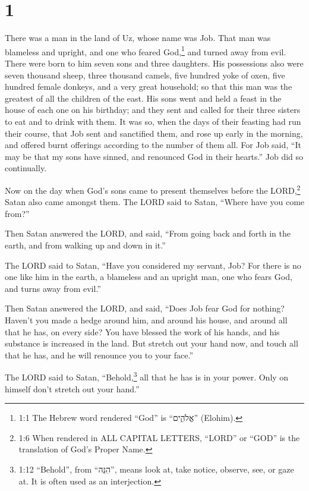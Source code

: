 \hypertarget{section}{%
\section{1}\label{section}}

 There was a man in the land of Uz, whose name was Job. That
man was blameless and upright, and one who feared God,\footnote{1:1 The
  Hebrew word rendered ``God'' is ``אֱלֹהִ֑ים'' (Elohim).} and turned
away from evil.  There were born to him seven sons and three
daughters.  His possessions also were seven thousand sheep,
three thousand camels, five hundred yoke of oxen, five hundred female
donkeys, and a very great household; so that this man was the greatest
of all the children of the east.  His sons went and held a
feast in the house of each one on his birthday; and they sent and called
for their three sisters to eat and to drink with them.  It
was so, when the days of their feasting had run their course, that Job
sent and sanctified them, and rose up early in the morning, and offered
burnt offerings according to the number of them all. For Job said, ``It
may be that my sons have sinned, and renounced God in their hearts.''
Job did so continually.

 Now on the day when God's sons came to present themselves
before the LORD,\footnote{1:6 When rendered in ALL CAPITAL LETTERS,
  ``LORD'' or ``GOD'' is the translation of God's Proper Name.} Satan
also came amongst them.  The LORD said to Satan, ``Where
have you come from?''

Then Satan answered the LORD, and said, ``From going back and forth in
the earth, and from walking up and down in it.''

 The LORD said to Satan, ``Have you considered my servant,
Job? For there is no one like him in the earth, a blameless and an
upright man, one who fears God, and turns away from evil.''

 Then Satan answered the LORD, and said, ``Does Job fear God
for nothing?  Haven't you made a hedge around him, and
around his house, and around all that he has, on every side? You have
blessed the work of his hands, and his substance is increased in the
land.  But stretch out your hand now, and touch all that he
has, and he will renounce you to your face.''

 The LORD said to Satan, ``Behold,\footnote{1:12
  ``Behold'', from ``הִנֵּה'', means look at, take notice, observe, see,
  or gaze at. It is often used as an interjection.} all that he has is
in your power. Only on himself don't stretch out your hand.''

